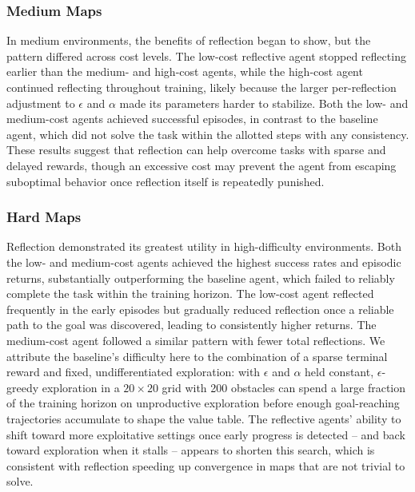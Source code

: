 \documentclass[11pt]{article}
\begin{document}
\subsubsection{Medium Maps}

In medium environments, the benefits of reflection began to show, but the pattern differed across cost levels. The low-cost reflective agent stopped reflecting earlier than the medium- and high-cost agents, while the high-cost agent continued reflecting throughout training, likely because the larger per-reflection adjustment to $\epsilon$ and $\alpha$ made its parameters harder to stabilize. Both the low- and medium-cost agents achieved successful episodes, in contrast to the baseline agent, which did not solve the task within the allotted steps with any consistency. These results suggest that reflection can help overcome tasks with sparse and delayed rewards, though an excessive cost may prevent the agent from escaping suboptimal behavior once reflection itself is repeatedly punished.




\subsubsection{Hard Maps}

Reflection demonstrated its greatest utility in high-difficulty environments. Both the low- and medium-cost agents achieved the highest success rates and episodic returns, substantially outperforming the baseline agent, which failed to reliably complete the task within the training horizon. The low-cost agent reflected frequently in the early episodes but gradually reduced reflection once a reliable path to the goal was discovered, leading to consistently higher returns. The medium-cost agent followed a similar pattern with fewer total reflections. We attribute the baseline's difficulty here to the combination of a sparse terminal reward and fixed, undifferentiated exploration: with $\epsilon$ and $\alpha$ held constant, $\epsilon$-greedy exploration in a $20\times20$ grid with 200 obstacles can spend a large fraction of the training horizon on unproductive exploration before enough goal-reaching trajectories accumulate to shape the value table. The reflective agents' ability to shift toward more exploitative settings once early progress is detected -- and back toward exploration when it stalls -- appears to shorten this search, which is consistent with reflection speeding up convergence in maps that are not trivial to solve.
\end{document}
